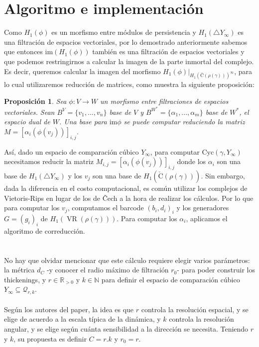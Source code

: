 \documentclass[12pt,a4paper]{article}
\newtheorem{proposition}[theorem]{Proposición}
\begin{document}
\section{Algoritmo e implementación}
Como $H_1(\phi)$ es un morfismo entre módulos de persistencia y $H_1(\triangle Y_\infty)$ es una filtración de espacios vectoriales, por lo demostrado anteriormente sabemos que entonces $\text{im}(H_1(\phi))$ también es una filtración de espacios vectoriales y que podemos restringirnos a calcular la imagen de la parte inmortal del complejo. Es decir, queremos calcular la imagen del morfismo $H_1(\phi)|_{H_1(Č(\rho(\gamma)))^\infty}$, para lo cual utilizaremos reducción de matrices, como muestra la siguiente proposición:
\begin{proposition}
    Sea $\phi: V \rightarrow W$ un morfismo entre filtraciones de espacios vectoriales. Sean $B^V = \{v_1,...,v_n\}$ base de $V$ y $B^{W^*} = \{\alpha_1,...,\alpha_m\}$ base de $W^*$, el espacio dual de $W$. Una base para $\text{im}\phi$ se puede computar reduciendo la matriz $M = [\alpha_i(\phi(v_j))]_{i,j}$.
\end{proposition}
Así, dado un espacio de comparación cúbico $Y_\infty$, para computar $\text{Cyc}(\gamma, Y_\infty)$ necesitamos reducir la matriz $M_{i,j} = [\alpha_i(\phi(v_j))]_{i,j}$ donde los $\alpha_i$ son una base de $H_1(\triangle Y_\infty)$ y los $v_j$ son una base de $H_1(\check{\text{C}}(\rho(\gamma)))$. Sin embargo, dada la diferencia en el costo computacional, es común utilizar los complejos de Vietoris-Rips en lugar de los de Čech a la hora de realizar los cálculos. Por lo que para computar los $v_j$, computamos el barcode $(b_i, d_i)_i$ y los generadores $G=(g_i)_i$ de $H_1(\operatorname{VR}(\rho(\gamma)))$. Para computar los $\alpha_i$, aplicamos el algoritmo de correducción.
\\
\\
\\
No hay que olvidar mencionar que este cálculo requiere elegir varios parámetros: la métrica $d_C$ -y conocer el radio máximo de filtración $r_0$- para poder construir los thickenings, y $r \in \mathbb{R}_{>0}$ y $k \in \mathbb{N}$ para definir el espacio de comparación cúbico $Y_\infty \subseteq \mathcal{Q}_{r,k}$.
\\
\\
Según los autores del paper, la idea es que $r$ controla la resolución espacial, y se elige de acuerdo a la escala típica de la dinámica, y $k$ controla la resolución angular, y se elige según cuánta sensibilidad a la dirección se necesita. Teniendo $r$ y $k$, su propuesta es definir $C = r.k$ y $r_0 = r$.
\newpage
\end{document}
